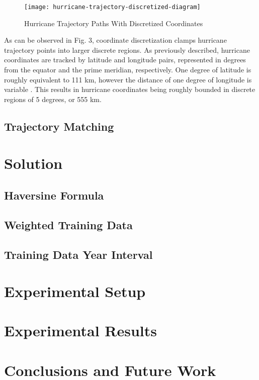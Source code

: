 \documentclass[12pt,conference]{IEEEtran}
\begin{document}
\begin{figure}[h]
\caption{Hurricane Trajectory Paths With Discretized Coordinates}
\centering
\texttt{[image: hurricane-trajectory-discretized-diagram]}
\end{figure}

As can be observed in Fig. 3, coordinate discretization clamps hurricane trajectory points into larger discrete regions. As previously described, hurricane coordinates are tracked by latitude and longitude pairs, represented in degrees from the equator and the prime meridian, respectively. One degree of latitude is roughly equivalent to 111 km, however the distance of one degree of longitude is variable \cite{lat-long-distance}. This results in hurricane coordinates being roughly bounded in discrete regions of 5 degrees, or 555 km.

\subsection{Trajectory Matching}

\section{Solution}

\subsection{Haversine Formula}

\subsection{Weighted Training Data}

\subsection{Training Data Year Interval}

\section{Experimental Setup}

\section{Experimental Results}

\section{Conclusions and Future Work} %
\end{document}

